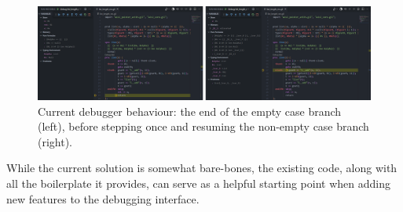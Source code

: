 \begin{figure}
  \center{}
  \includegraphics[width=\textwidth]{img/debug-step-current.png}
  \caption{
    Current debugger behaviour: the end of the empty case branch (left), before
    stepping once and resuming the non-empty case branch (right).}%
  \label{fig:debug-step-current}
\end{figure}

While the current solution is somewhat bare-bones, the existing code, along with
all the boilerplate it provides, can serve as a helpful starting point when
adding new features to the debugging interface.
